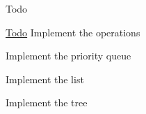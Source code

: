 \begin{DoxyRefDesc}{Todo}
\item[\mbox{\hyperlink{todo__todo000001}{Todo}}]Implement the operations 

Implement the priority queue 

Implement the list 

Implement the tree \end{DoxyRefDesc}
